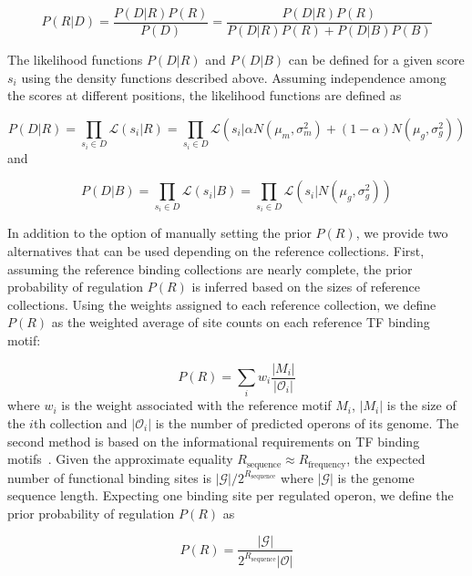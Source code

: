 \documentclass[12pt]{article}
\begin{document}
\begin{equation}
P(R|D) = \frac{P(D|R)P(R)}{P(D)} = \frac{P(D|R)P(R)}{P(D|R)P(R) + P(D|B)P(B)}
\end{equation}

The likelihood functions $P(D|R)$ and $P(D|B)$ can be defined for a given score
$s_i$ using the density functions described above. Assuming independence among
the scores at different positions, the likelihood functions are defined as

\begin{equation}
  P(D|R) = \prod_{s_i \in D} \mathcal{L}(s_i|R) =
  \prod_{s_i \in D} \mathcal{L}(s_i | \alpha N(\mu_m, \sigma_m^2) + (1-\alpha)N(\mu_g,\sigma_g^2))
\end{equation}
and

\begin{equation}
  P(D|B) = \prod_{s_i \in D} \mathcal{L}(s_i|B) = \prod_{s_i \in D} \mathcal{L}(s_i | N(\mu_g, \sigma_g^2))
\end{equation}

In addition to the option of manually setting the prior $P(R)$, we provide two
alternatives that can be used depending on the reference collections. First,
assuming the reference binding collections are nearly complete, the prior
probability of regulation $P(R)$ is inferred based on the sizes of reference
collections. Using the weights assigned to each reference collection, we define
$P(R)$ as the weighted average of site counts on each reference TF binding
motif:

\begin{equation}
P(R) = \sum_i w_i \frac{|M_i|}{|\mathcal{O}_i|}
\end{equation}
where $w_i$ is the weight associated with the reference motif $M_i$, $|M_i|$ is
the size of the $i$th collection and $|\mathcal{O}_i|$ is the number of
predicted operons of its genome. The second method is based on the
informational requirements on TF binding motifs~\cite{schneider1986information,
  schneider2000evolution, o2014informational}. Given the approximate equality
$R_{\mathrm{sequence}} \approx R_{\mathrm{frequency}}$, the expected number of
functional binding sites is $|\mathcal{G}| / 2^{R_{\mathrm{sequence}}}$ where
$|\mathcal{G}|$ is the genome sequence length. Expecting one binding site per
regulated operon, we define the prior probability of regulation $P(R)$ as

\begin{equation}
P(R) = \frac{|\mathcal{G}|}{2^{R_{\mathrm{sequence}}} |\mathcal{O}|}
\end{equation}
\end{document}
